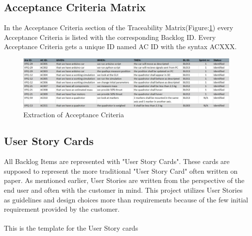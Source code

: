 \subsection{Acceptance Criteria Matrix}
In the Acceptance Criteria section of the Traceability Matrix(Figure:\ref{fig:acm}) every Acceptance Criteria is listed with the corresponding Backlog ID. Every Acceptance Criteria gets a unique ID named AC ID with the syntax ACXXX. 
\begin{figure}[h]
    \centering
        \includegraphics[width = 1\textwidth]{VAPIQ-PICTURES/AC}
    \caption{Extraction of Acceptance Criteria}
    \label{fig:acm}
\end{figure}

\newpage

\subsection{User Story Cards}
All Backlog Items are represented with "User Story Cards". These cards are supposed to represent the more traditional "User Story Card" often written on paper. As mentioned earlier, User Stories are written from the perspective of the end user and often with the customer in mind. This project utilizes User Stories as guidelines and design choices more than requirements because of the few initial requirement provided by the customer. \\ 
\\
This is the template for the User Story cards 

\krav{}{}{}{}{}{}{}


